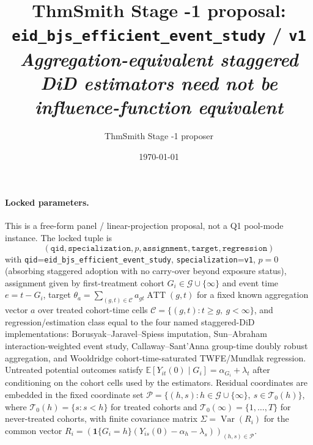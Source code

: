 \documentclass[11pt]{article}
\title{ThmSmith Stage -1 proposal: \texttt{eid\_bjs\_efficient\_event\_study} / \texttt{v1}%
  \\ \large\textit{Aggregation-equivalent staggered DiD estimators need not be influence-function equivalent}}
\author{ThmSmith Stage -1 proposer}
\date{\today}
\newcommand{\E}{\mathbb{E}}
\newcommand{\one}{\mathbf{1}}
\theoremstyle{definition}
\theoremstyle{plain}
\theoremstyle{remark}
\begin{document}
\maketitle


\paragraph{Locked parameters.}
This is a free-form panel / linear-projection proposal, not a Q1 pool-mode instance.
The locked tuple is
\[
  (\texttt{qid},\texttt{specialization},p,\texttt{assignment},\texttt{target},\texttt{regression})
\]
with \texttt{qid}=\texttt{eid\_bjs\_efficient\_event\_study}, \texttt{specialization}=\texttt{v1},
\(p=0\) (absorbing staggered adoption with no carry-over beyond exposure status), assignment
given by first-treatment cohort \(G_i\in\mathcal G\cup\{\infty\}\) and event time \(e=t-G_i\),
target \(\theta_a=\sum_{(g,t)\in\mathcal C} a_{gt}\operatorname{ATT}(g,t)\) for a fixed known
aggregation vector \(a\) over treated cohort-time cells \(\mathcal C=\{(g,t):t\ge g,\ g<\infty\}\),
and regression/estimation class equal to the four named staggered-DiD implementations:
Borusyak--Jaravel--Spiess imputation, Sun--Abraham interaction-weighted event study,
Callaway--Sant'Anna group-time doubly robust aggregation, and Wooldridge cohort-time-saturated
TWFE/Mundlak regression.  Untreated potential outcomes satisfy
\(\E[Y_{it}(0)\mid G_i]=\alpha_{G_i}+\lambda_t\) after conditioning on the cohort cells used by the
estimators.  Residual coordinates are embedded in the fixed coordinate set
\(\mathcal P=\{(h,s):h\in\mathcal G\cup\{\infty\},\ s\in\mathcal T_0(h)\}\), where
\(\mathcal T_0(h)=\{s:s<h\}\) for treated cohorts and \(\mathcal T_0(\infty)=\{1,\ldots,T\}\) for
never-treated cohorts, with finite covariance matrix \(\Sigma=\operatorname{Var}(R_i)\) for the
common vector \(R_i=(\one\{G_i=h\}(Y_{is}(0)-\alpha_h-\lambda_s))_{(h,s)\in\mathcal P}\).
\end{document}
